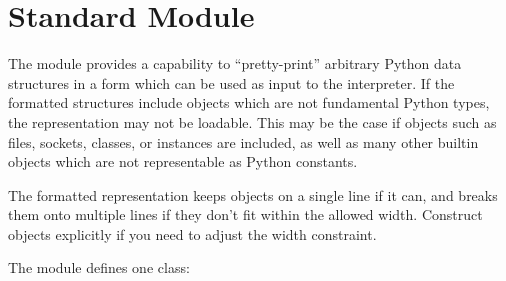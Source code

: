 
\section{Standard Module }
\label{module-pprint}

The  module provides a capability to ``pretty-print''
arbitrary Python data structures in a form which can be used as input
to the interpreter.  If the formatted structures include objects which
are not fundamental Python types, the representation may not be
loadable.  This may be the case if objects such as files, sockets,
classes, or instances are included, as well as many other builtin
objects which are not representable as Python constants.

The formatted representation keeps objects on a single line if it can,
and breaks them onto multiple lines if they don't fit within the
allowed width.  Construct  objects explicitly if
you need to adjust the width constraint.

The  module defines one class:



